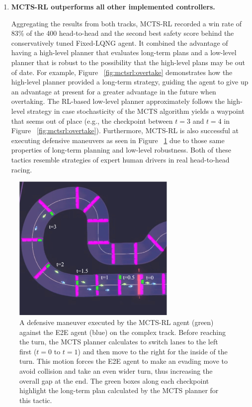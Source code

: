 \begin{enumerate}[wide, labelindent=0pt, font=\bfseries]
\item \textbf{MCTS-RL outperforms all other implemented controllers.}  

 Aggregating the results from both tracks, MCTS-RL recorded a win rate of 83\% of the 400 head-to-head and the second best safety score behind the conservatively tuned Fixed-LQNG agent. It combined the advantage of having a high-level planner that evaluates long-term plans and a low-level planner that is robust to the possibility that the high-level plans may be out of date. For example, Figure~ \ref{fig:mctsrl:overtake} demonstrates how the high-level planner provided a long-term strategy, guiding the agent to give up an advantage at present for a greater advantage in the future when overtaking. The RL-based low-level planner approximately follows the high-level strategy in case stochasticity of the MCTS algorithm yields a waypoint that seems out of place (e.g., the checkpoint between $t=3$ and $t=4$ in Figure~ \ref{fig:mctsrl:overtake}). Furthermore, MCTS-RL is also successful at executing defensive maneuvers as seen in Figure~ \ref{fig:mctsrl:defense} due to those same properties of long-term planning and low-level robustness. Both of these tactics resemble strategies of expert human drivers in real head-to-head racing.
 \end{enumerate}
 
 \begin{figure}
    \centering
  \includegraphics[width=0.7\textwidth]{Figures/MCTSRLDefense.png}
  \caption[Defensive maneuver by MCTS-RL controller.]{A defensive maneuver executed by the MCTS-RL agent (green) against the E2E agent (blue) on the complex track.  Before reaching the turn, the MCTS planner calculates to switch lanes to the left first ($t=0$ to $t=1$) and then move to the right for the inside of the turn. This motion forces the E2E agent to make an evading move to avoid collision and take an even wider turn, thus increasing the overall gap at the end. The green boxes along each checkpoint highlight the long-term plan calculated by the MCTS planner for this tactic.}
  \label{fig:mctsrl:defense}
\end{figure}

